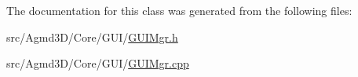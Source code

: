 The documentation for this class was generated from the following files\+:\begin{DoxyCompactItemize}
\item 
src/\+Agmd3\+D/\+Core/\+G\+U\+I/\hyperlink{_g_u_i_mgr_8h}{G\+U\+I\+Mgr.\+h}\item 
src/\+Agmd3\+D/\+Core/\+G\+U\+I/\hyperlink{_g_u_i_mgr_8cpp}{G\+U\+I\+Mgr.\+cpp}\end{DoxyCompactItemize}
